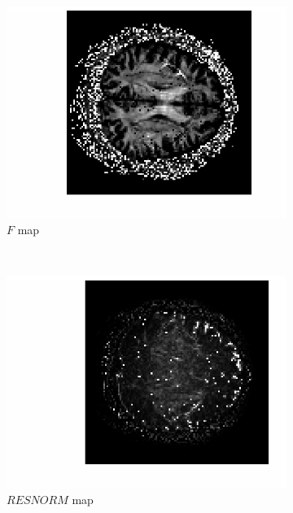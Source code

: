 \documentclass[11pt,a4paper,oneside]{report}
\begin{document}
\begin{figure}[H]
  \centering
  \begin{subfigure}[b]{0.5\textwidth}
      \centering
    \includegraphics[scale=1]{figures/q1/q114-F.eps}
    \caption{$F$ map}
    \label{q114-F}
  \end{subfigure}%
  ~
  \begin{subfigure}[b]{0.5\textwidth}
      \centering
    \includegraphics[scale=1]{figures/q1/q114-RESNORM.eps}
    \caption{$RESNORM$ map}
    \label{q114-RESNORM}
  \end{subfigure}%
  \caption{}

\end{figure}
\end{document}
